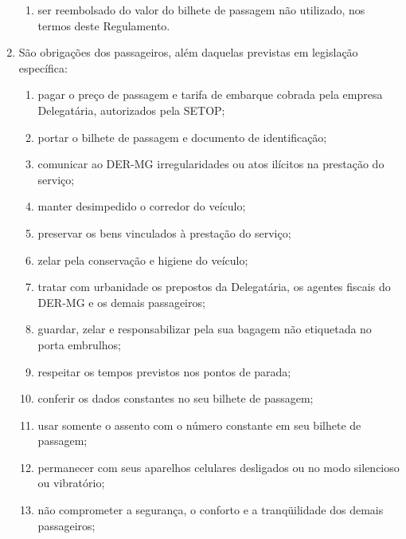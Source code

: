 \begin{enumerate}[resume, label=Art. \arabic*]
\begin{enumerate}[label=\roman*.]
\item ser reembolsado do valor do bilhete de passagem não utilizado, nos termos deste Regulamento.

\end{enumerate}

\item São obrigações dos passageiros, além daquelas previstas em legislação específica:

\begin{enumerate}[label=\roman*.]

\item pagar o preço de passagem e tarifa de embarque cobrada pela empresa Delegatária, autorizados pela SETOP;

\item portar o bilhete de passagem e documento de identificação;

\item comunicar ao DER-MG irregularidades ou atos ilícitos na prestação do serviço;

\item manter desimpedido o corredor do veículo;

\item preservar os bens vinculados à prestação do serviço;

\item zelar pela conservação e higiene do veículo;

\item tratar com urbanidade os prepostos da Delegatária, os agentes fiscais do DER-MG e os demais passageiros;

\item guardar, zelar e responsabilizar pela sua bagagem não etiquetada no porta embrulhos;

\item respeitar os tempos previstos nos pontos de parada;

\item conferir os dados constantes no seu bilhete de passagem;

\item usar somente o assento com o número constante em seu bilhete de passagem;

\item permanecer com seus aparelhos celulares desligados ou no modo silencioso ou vibratório;

\item não comprometer a segurança, o conforto e a tranqüilidade dos demais passageiros;


\end{enumerate}
\end{enumerate}
